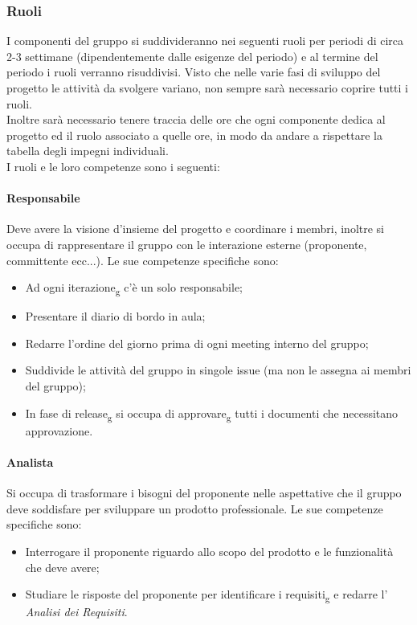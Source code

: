 \subsubsection{Ruoli}
I componenti del gruppo si suddivideranno nei seguenti ruoli per periodi di circa 2-3 settimane (dipendentemente dalle esigenze del periodo) e al termine del periodo i ruoli verranno risuddivisi. 
Visto che nelle varie fasi di sviluppo del progetto le attività da svolgere variano, non sempre sarà necessario coprire tutti i ruoli.\\
Inoltre sarà necessario tenere traccia delle ore che ogni componente dedica al progetto ed il ruolo associato a quelle ore, in modo da andare a rispettare la tabella degli impegni individuali.\\
I ruoli e le loro competenze sono i seguenti:

\paragraph{Responsabile}
Deve avere la visione d'insieme del progetto e coordinare i membri, inoltre si occupa di rappresentare il gruppo con le interazione esterne (proponente, committente ecc...). Le sue competenze specifiche sono:
\begin{itemize}
	\item Ad ogni iterazione\textsubscript{g} c'è un solo responsabile;
	\item Presentare il diario di bordo in aula;
	\item Redarre l'ordine del giorno prima di ogni meeting interno del gruppo;
	\item Suddivide le attività del gruppo in singole issue (ma non le assegna ai membri del gruppo);
	\item In fase di release\textsubscript{g} si occupa di approvare\textsubscript{g} tutti i documenti che necessitano approvazione.
\end{itemize}

\paragraph{Analista}
Si occupa di trasformare i bisogni del proponente nelle aspettative che il gruppo deve soddisfare per sviluppare un prodotto professionale. Le sue competenze specifiche sono:
\begin{itemize}
	\item Interrogare il proponente riguardo allo scopo del prodotto e le funzionalità che deve avere;
	\item Studiare le risposte del proponente per identificare i requisiti\textsubscript{g} e redarre l' \textit{Analisi dei Requisiti}.
\end{itemize}

